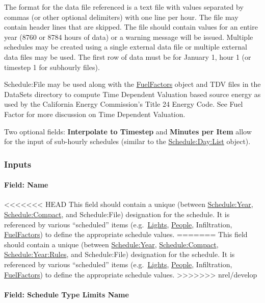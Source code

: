 The format for the data file referenced is a text file with values separated by commas (or other optional delimiters) with one line per hour. The file may contain header lines that are skipped. The file should contain values for an entire year (8760 or 8784 hours of data) or a warning message will be issued. Multiple schedules may be created using a single external data file or multiple external data files may be used. The first row of data must be for January 1, hour 1 (or timestep 1 for subhourly files).

Schedule:File may be used along with the \hyperref[fuelfactors]{FuelFactors} object and TDV files in the DataSets directory to compute Time Dependent Valuation based source energy as used by the California Energy Commission's Title 24 Energy Code. See Fuel Factor for more discussion on Time Dependent Valuation.

Two optional fields: \textbf{Interpolate to Timestep} and \textbf{Minutes per Item} allow for the input of sub-hourly schedules (similar to the \hyperref[scheduledaylist]{Schedule:Day:List} object).

\subsubsection{Inputs}\label{inputs-9-019}

\paragraph{Field: Name}\label{field-name-8-018}

<<<<<<< HEAD
This field should contain a unique (between \hyperref[scheduleyear]{Schedule:Year}, \hyperref[schedulecompact]{Schedule:Compact}, and Schedule:File) designation for the schedule. It is referenced by various ``scheduled'' items (e.g.~\hyperref[lights-000]{Lights}, \hyperref[people]{People}, Infiltration, \hyperref[fuelfactors]{FuelFactors}) to define the appropriate schedule values.
=======
This field should contain a unique (between \hyperref[scheduleyear]{Schedule:Year}, \hyperref[schedulecompact]{Schedule:Compact}, \hyperref[scheduleyearrules]{Schedule:Year:Rules}, and Schedule:File) designation for the schedule. It is referenced by various ``scheduled'' items (e.g.~\hyperref[lights-000]{Lights}, \hyperref[people]{People}, Infiltration, \hyperref[fuelfactors]{FuelFactors}) to define the appropriate schedule values.
>>>>>>> nrel/develop

\paragraph{Field: Schedule Type Limits Name}\label{field-schedule-type-limits-name-6}

